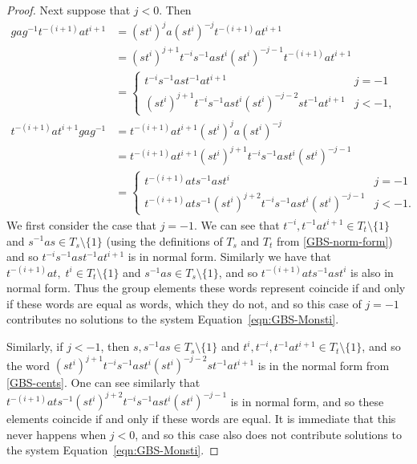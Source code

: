 \documentclass[11pt]{amsart}
\theoremstyle{definition}
\numberwithin{theorem}{section}
\begin{document}
\begin{proof}
	Next suppose that \(j <
			0\).  Then
			\begin{align*}
					gag^{-1} t^{-(i + 1)} a t^{i + 1} & = (st^i)^j a (st^i)^{-j} t^{-(i + 1)} a t^{i + 1} \\
										& = (st^i)^{j + 1} t^{-i} s^{-1} a s
										t^i (st^i)^{-j - 1} t^{-(i + 1)} a t^{i + 1}
										\\
										& = 
										\begin{cases}
										t^{-i} s^{-1} a s
										 t^{-1} a t^{i + 1} & j = -1 \\
										(st^i)^{j + 1} t^{-i} s^{-1} a s
										t^i (st^i)^{-j -2} s t^{-1} a t^{i + 1}
										& j < -1,
										\end{cases}
										\\
										t^{-(i + 1)} a t^{i + 1} gag^{-1}
										& = t^{-(i + 1)} a t^{i + 1}
										(st^i)^j a (st^i)^{-j} \\
										& = t^{-(i + 1)} a t^{i + 1}
										(st^i)^{j + 1} t^{-i} s^{-1} a s
								t^i (st^i)^{-j - 1} \\
										& = \begin{cases}
										t^{-(i + 1)} a t s^{-1} a s t^i & j = -1 \\
										t^{-(i + 1)} a t s^{-1}
										(st^i)^{j + 2} t^{-i} s^{-1} a s
								t^i (st^i)^{-j - 1} 
																		& j < -1.
										\end{cases}
			\end{align*}
			We first consider the case that \(j = -1\). We can see that
			\(t^{-i}, t^{-1} a t^{i + 1} \in T_t \setminus \{1\}\) and \(s^{-1}
			a s\in T_s \setminus \{1\}\) (using the definitions of \(T_s\) and
			\(T_t\) from \cref{GBS-norm-form}) and so \(t^{-i} s^{-1} a s
			t^{-1} a t^{i + 1}\) is in normal form. Similarly we have that
			\(t^{-(i + 1)} a t, \; t^i \in T_t \setminus \{1\}\) and
			\(s^{-1} a s \in T_s \setminus \{1\}\), and so
			\(t^{-(i + 1)} a t s^{-1} a st^i\) is also in normal form.
			Thus the group elements these words represent coincide
			if and only if these words are equal as words, which they do not,
			and so this case of \(j = -1\) contributes no solutions to
			the system Equation~\eqref{eqn:GBS-Monsti}.

			Similarly, if \(j < -1\), then \(s, s^{-1} as \in T_s \setminus
			\{1\}\) and \(t^i, t^{-i}, t^{-1} a t^{i + 1} \in T_t \setminus
			\{1\}\), and so the word \((st^i)^{j + 1} t^{-i} s^{-1} a s t^i
			(st^i)^{-j -2} s t^{-1} a t^{i + 1}\) is in the normal form from
			\cref{GBS-cents}. One can see similarly that \(t^{-(i + 1)} a t
			s^{-1} (st^i)^{j + 2} t^{-i} s^{-1} a s t^i (st^i)^{-j - 1}\) is in
			normal form, and so these elements coincide if and only if these
			words are equal. It is immediate that this never happens when \(j <
			0\), and so this case also does not contribute solutions to the
			system Equation~\eqref{eqn:GBS-Monsti}.


\end{proof}
\end{document}
